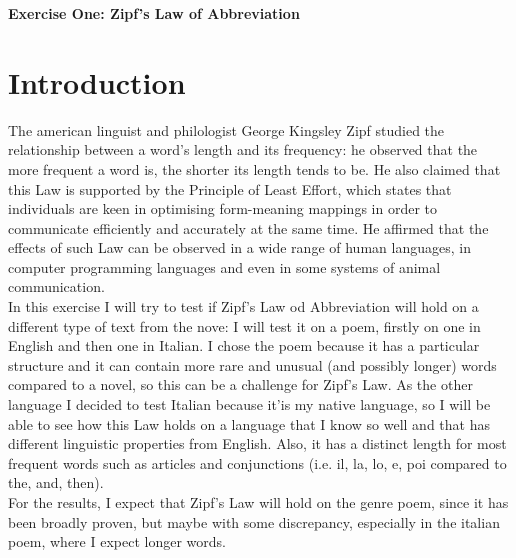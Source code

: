 \begin{flushleft}
    {\fontsize{16}{18}\selectfont\textbf{Exercise One: Zipf’s Law of Abbreviation}} 
\end{flushleft}

\section{Introduction}
The american linguist and philologist George Kingsley Zipf studied the relationship between a word’s length and its frequency: he observed that the more frequent a word is, the shorter its length tends to be. 
He also claimed that this Law is supported by the Principle of Least Effort, which states that individuals are keen in optimising form-meaning mappings in order to communicate efficiently and accurately at the same time. 
He affirmed that the effects of such Law can be observed in a wide range of human languages, in computer programming languages and even in some systems of animal communication.\\
In this exercise I will try to test if Zipf's Law od Abbreviation will hold on a different type of text from the nove: I will test it on a poem, firstly on one in English and then one in Italian. 
I chose the poem because it has a particular structure and it can contain more rare and unusual (and possibly longer) words compared to a novel, so this can be a challenge for Zipf's Law. 
As the other language I decided to test Italian because it'is my native language, so I will be able to see how this Law holds on a language that I know so well and that has different linguistic properties from English. 
Also, it has a distinct length for most frequent words such as articles and conjunctions (i.e. il, la, lo, e, poi compared to the, and, then).\\
For the results, I expect that Zipf's Law will hold on the genre poem, since it has been broadly proven, but maybe with some discrepancy, especially in the italian poem, where I expect longer words.



